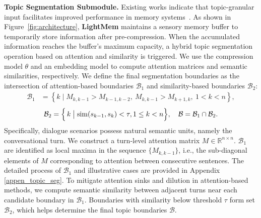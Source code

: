 \noindent \textbf{Topic Segmentation Submodule.}
Existing works indicate that topic-granular input facilitates improved performance in memory systems~\citep{DBLP:conf/iclr/PanWJLCL0LZQ025, tan2025prospectretrospectreflectivememory}. 
As shown in Figure~\ref{fig:architecture}, \textbf{LightMem} maintains a sensory memory buffer to temporarily store information after pre-compression. 
When the accumulated information reaches the buffer's maximum capacity, a hybrid topic segmentation operation based on attention and similarity is triggered. 
We use the compression model $\theta$ and an embedding model to compute attention matrices and semantic similarities, respectively.
We define the final segmentation boundaries as the intersection of attention-based boundaries $\mathcal{B}_1$ and similarity-based boundaries $\mathcal{B}_2$: 
\[
\begin{aligned}
\mathcal{B}_1 &= \left\{ k \mid M_{k,k-1} > M_{k-1,k-2},\ M_{k,k-1} > M_{k+1,k},\ 1 < k < n \right\}, 
\end{aligned}
\]
\[
\mathcal{B}_2 = \Bigl\{\, k \;\big|\; \mathrm{sim}(s_{k-1}, s_k) < \tau ,1 \leq k < n\Bigr\}, \quad 
\mathcal{B} = \mathcal{B}_1 \cap \mathcal{B}_2.
\]
Specifically, dialogue scenarios possess natural semantic units, namely the conversational turn. 
We construct a turn-level attention matrix $M \in \mathbb{R}^{n \times n}$. 
$\mathcal{B}_1$ are identified as local maxima in the sequence $\{M_{k,k-1}\}$, i.e., the sub-diagonal elements of $M$ corresponding to attention between consecutive sentences. 
The detailed process of $\mathcal{B}_1$ and illustrative cases are provided in Appendix \ref{appen_topic_seg}. 
To mitigate attention sinks and dilution in attention-based methods, we compute semantic similarity between adjacent turns near each candidate boundary in $\mathcal{B}_1$. Boundaries with similarity below threshold $\tau$ form set $\mathcal{B}_2$, which helps determine the final topic boundaries $\mathcal{B}$.

